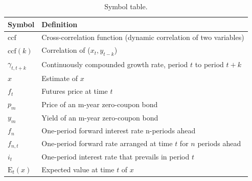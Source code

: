 \begin{table}[H]
\centering
\caption{Symbol table.}
\begin{tabular*}{1.02\textwidth}{l@{\extracolsep{\fill}}l}
\toprule
Symbol & Definition\\
\midrule
$\mathrm{ccf}$             &Cross-correlation function (dynamic correlation of two variables)\\
$\mathrm{ccf}(k)$         &Correlation of ($x_t, y_{t-k}$)\\
$\gamma_{t,t+k}$         &Continuously compounded growth rate, period $t$ to period $t+k$\\
$\hat{x}$                & Estimate of $x$\\
$f_t$                     & Futures price at time $t$\\
$p_m$                     &Price of an m-year zero-coupon bond\\
$y_m$                     &Yield of an m-year zero-coupon bond\\
$f_n$                     &One-period forward interest rate n-periods ahead\\
$f_{n,t}$                 &One-period forward rate arranged at time $t$ for $n$ periods ahead\\
$i_t$                     &One-period interest rate that prevails in period $t$\\
$\mathrm{E}_t(x)$         &Expected value at time $t$ of $x$\\
\bottomrule
\end{tabular*}
\end{table}

